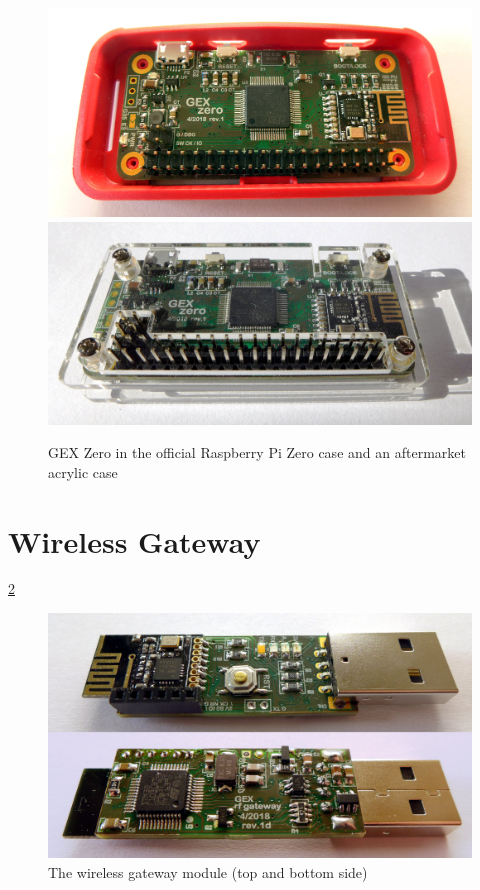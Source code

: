 \begin{figure}[h]
	\centering
	\includegraphics[width=.9\textwidth]{img/photo-zero-picase.jpg} \\
	\vspace{1mm}
	\includegraphics[width=.9\textwidth]{img/photo-zero-transparent.jpg}
	\caption[The GEX Zero module]{\label{fig:gexzcases}GEX Zero in the official Raspberry Pi Zero case and an aftermarket acrylic case}
\end{figure}


\section{Wireless Gateway} \label{sec:rfgateway}

\cref{fig:gwxgw}



\begin{figure}[h]
	\centering
	\includegraphics[width=.9\textwidth]{img/photo-rfdongle.jpg}
	\caption{\label{fig:gwxgw}The wireless gateway module (top and bottom side)}
\end{figure}


